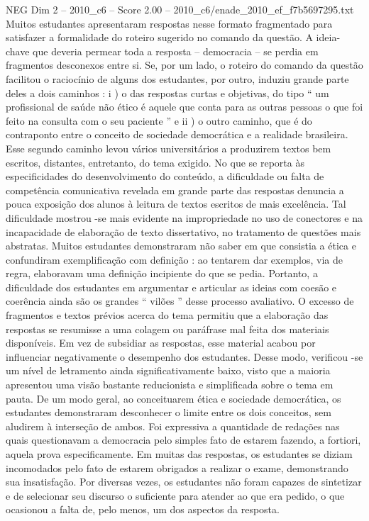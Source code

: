 \begin{textsample}{NEG Dim 2 – 2010\_c6 – Score 2.00 – 2010\_c6/enade\_2010\_ef\_f7b5697295.txt}
Muitos estudantes apresentaram respostas nesse formato fragmentado para satisfazer a formalidade do roteiro sugerido no comando da questão.
A ideia-chave que deveria permear toda a resposta – democracia – se perdia em fragmentos desconexos entre si.
Se, por um lado, o roteiro do comando da questão facilitou o raciocínio de alguns dos estudantes, por outro, induziu grande parte deles a dois caminhos : i ) o das respostas curtas e objetivas, do tipo “ um profissional de saúde não ético é aquele que conta para as outras pessoas o que foi feito na consulta com o seu paciente ” e ii ) o outro caminho, que é do contraponto entre o conceito de sociedade democrática e a realidade brasileira.
Esse segundo caminho levou vários universitários a produzirem textos bem escritos, distantes, entretanto, do tema exigido.
No que se reporta às especificidades do desenvolvimento do conteúdo, a dificuldade ou falta de competência comunicativa revelada em grande parte das respostas denuncia a pouca exposição dos alunos à leitura de textos escritos de mais excelência.
Tal dificuldade mostrou -se mais evidente na impropriedade no uso de conectores e na incapacidade de elaboração de texto dissertativo, no tratamento de questões mais abstratas.
Muitos estudantes demonstraram não saber em que consistia a ética e confundiram exemplificação com definição : ao tentarem dar exemplos, via de regra, elaboravam uma definição incipiente do que se pedia.
Portanto, a dificuldade dos estudantes em argumentar e articular as ideias com coesão e coerência ainda são os grandes “ vilões ” desse processo avaliativo.
O excesso de fragmentos e textos prévios acerca do tema permitiu que a elaboração das respostas se resumisse a uma colagem ou paráfrase mal feita dos materiais disponíveis.
Em vez de subsidiar as respostas, esse material acabou por influenciar negativamente o desempenho dos estudantes.
Desse modo, verificou -se um nível de letramento ainda significativamente baixo, visto que a maioria apresentou uma visão bastante reducionista e simplificada sobre o tema em pauta.
De um modo geral, ao conceituarem ética e sociedade democrática, os estudantes demonstraram desconhecer o limite entre os dois conceitos, sem aludirem à interseção de ambos.
Foi expressiva a quantidade de redações nas quais questionavam a democracia pelo simples fato de estarem fazendo, a fortiori, aquela prova especificamente.
Em muitas das respostas, os estudantes se diziam incomodados pelo fato de estarem obrigados a realizar o exame, demonstrando sua insatisfação.
Por diversas vezes, os estudantes não foram capazes de sintetizar e de selecionar seu discurso o suficiente para atender ao que era pedido, o que ocasionou a falta de, pelo menos, um dos aspectos da resposta.

\end{textsample}
